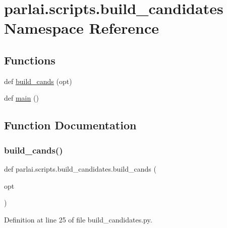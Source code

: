 \hypertarget{namespaceparlai_1_1scripts_1_1build__candidates}{}\section{parlai.\+scripts.\+build\+\_\+candidates Namespace Reference}
\label{namespaceparlai_1_1scripts_1_1build__candidates}
\subsection*{Functions}
\begin{DoxyCompactItemize}
\item 
def \hyperlink{namespaceparlai_1_1scripts_1_1build__candidates_a7932b774b6e77c36347f89f3d79c676e}{build\+\_\+cands} (opt)
\item 
def \hyperlink{namespaceparlai_1_1scripts_1_1build__candidates_a99ffd6743adcd4a6f0f5a26418d21a3a}{main} ()
\end{DoxyCompactItemize}


\subsection{Function Documentation}
\mbox{\label{namespaceparlai_1_1scripts_1_1build__candidates_a7932b774b6e77c36347f89f3d79c676e}} 
\subsubsection{\texorpdfstring{build\+\_\+cands()}{build\_cands()}}
{\footnotesize\ttfamily def parlai.\+scripts.\+build\+\_\+candidates.\+build\+\_\+cands (\begin{DoxyParamCaption}\item[{}]{opt }\end{DoxyParamCaption})}



Definition at line 25 of file build\+\_\+candidates.\+py.


